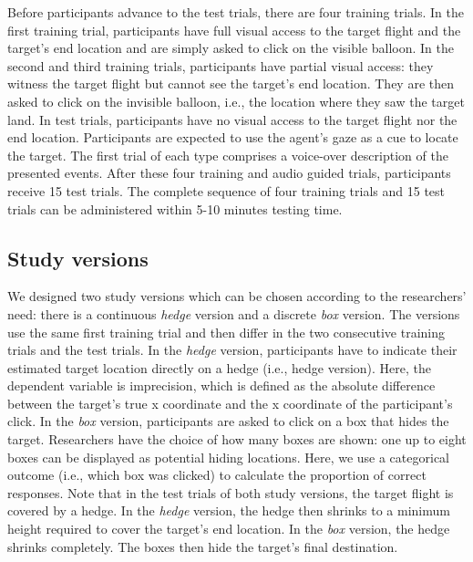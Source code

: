 \documentclass[
  english,
  man,floatsintext]{apa6}
\begin{document}
Before participants advance to the test trials, there are four training trials. In the first training trial, participants have full visual access to the target flight and the target's end location and are simply asked to click on the visible balloon. In the second and third training trials, participants have partial visual access: they witness the target flight but cannot see the target's end location. They are then asked to click on the invisible balloon, i.e., the location where they saw the target land. In test trials, participants have no visual access to the target flight nor the end location. Participants are expected to use the agent's gaze as a cue to locate the target. The first trial of each type comprises a voice-over description of the presented events. After these four training and audio guided trials, participants receive 15 test trials. The complete sequence of four training trials and 15 test trials can be administered within 5-10 minutes testing time.

\hypertarget{study-versions}{%
\subsection{Study versions}\label{study-versions}}

We designed two study versions which can be chosen according to the researchers' need: there is a continuous \emph{hedge} version and a discrete \emph{box} version. The versions use the same first training trial and then differ in the two consecutive training trials and the test trials.
In the \emph{hedge} version, participants have to indicate their estimated target location directly on a hedge (i.e., hedge version).
Here, the dependent variable is imprecision, which is defined as the absolute difference between the target's true x coordinate and the x coordinate of the participant's click.
In the \emph{box} version, participants are asked to click on a box that hides the target. Researchers have the choice of how many boxes are shown: one up to eight boxes can be displayed as potential hiding locations. Here, we use a categorical outcome (i.e., which box was clicked) to calculate the proportion of correct responses.
Note that in the test trials of both study versions, the target flight is covered by a hedge. In the \emph{hedge} version, the hedge then shrinks to a minimum height required to cover the target's end location. In the \emph{box} version, the hedge shrinks completely. The boxes then hide the target's final destination.
\end{document}
